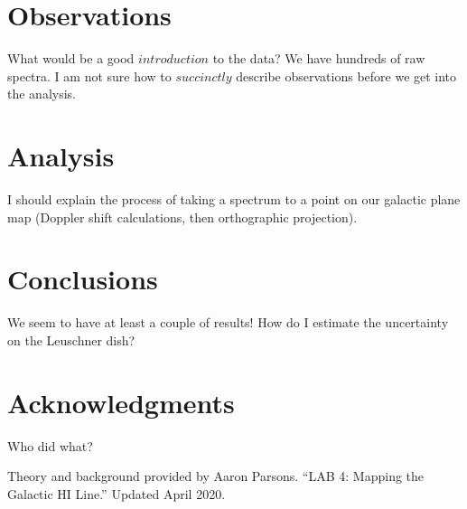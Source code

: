 \documentclass[12pt]{article}
\begin{document}
\section{Observations}

\quad \quad What would be a good $introduction$ to the data? We have hundreds of raw spectra. I am not sure how to $succinctly$ describe observations before we get into the analysis.

\section{Analysis}

\quad \quad I should explain the process of taking a spectrum to a point on our galactic plane map (Doppler shift calculations, then orthographic projection). 

\section{Conclusions}

\quad \quad We seem to have at least a couple of results! How do I estimate the uncertainty on the Leuschner dish?

\section{Acknowledgments}

\quad \quad Who did what?

Theory and background provided by Aaron Parsons. ``LAB 4: Mapping the Galactic HI Line.'' Updated April 2020.

\end{document}
